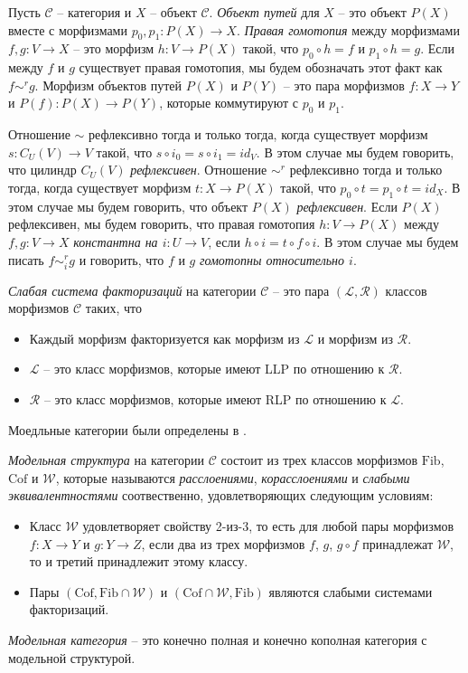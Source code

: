 \documentclass[reqno]{amsart}
\theoremstyle{definition}
\theoremstyle{remark}
\newcommand{\cat}[1]{\mathcal{#1}}
\renewcommand{\C}{\cat{C}}
\newcommand{\we}{\mathcal{W}}
\newcommand{\fib}{\mathrm{Fib}}
\newcommand{\cof}{\mathrm{Cof}}
\newcommand{\cyli}{i}
\begin{document}
Пусть $\C$ -- категория и $X$ -- объект $\C$.
\emph{Объект путей} для $X$ -- это объект $P(X)$ вместе с морфизмами $p_0,p_1 : P(X) \to X$.
\emph{Правая гомотопия} между морфизмами $f,g : V \to X$ -- это морфизм $h : V \to P(X)$ такой, что $p_0 \circ h = f$ и $p_1 \circ h = g$.
Если между $f$ и $g$ существует правая гомотопия, мы будем обозначать этот факт как $f \sim^r g$.
Морфизм объектов путей $P(X)$ и $P(Y)$ -- это пара морфизмов $f : X \to Y$ и $P(f) : P(X) \to P(Y)$, которые коммутируют с $p_0$ и $p_1$.

Отношение $\sim$ рефлексивно тогда и только тогда, когда существует морфизм $s : C_U(V) \to V$ такой, что $s \circ \cyli_0 = s \circ \cyli_1 = id_V$.
В этом случае мы будем говорить, что цилиндр $C_U(V)$ \emph{рефлексивен}.
Отношение $\sim^r$ рефлексивно тогда и только тогда, когда существует морфизм $t : X \to P(X)$ такой, что $p_0 \circ t = p_1 \circ t = id_X$.
В этом случае мы будем говорить, что объект $P(X)$ \emph{рефлексивен}.
Если $P(X)$ рефлексивен, мы будем говорить, что правая гомотопия $h : V \to P(X)$ между $f,g : V \to X$ \emph{константна на $i : U \to V$}, если $h \circ i = t \circ f \circ i$.
В этом случае мы будем писать $f \sim^r_i g$ и говорить, что $f$ и $g$ \emph{гомотопны относительно $i$}.

\begin{defn}
\emph{Слабая система факторизаций} на категории $\C$ -- это пара $(\mathcal{L},\mathcal{R})$ классов морфизмов $\C$ таких, что
\begin{itemize}
\item Каждый морфизм факторизуется как морфизм из $\mathcal{L}$ и морфизм из $\mathcal{R}$.
\item $\mathcal{L}$ -- это класс морфизмов, которые имеют LLP по отношению к $\mathcal{R}$.
\item $\mathcal{R}$ -- это класс морфизмов, которые имеют RLP по отношению к $\mathcal{L}$.
\end{itemize}
\end{defn}

Моедльные категории были определены в \cite{quillen}.

\begin{defn}
\emph{Модельная структура} на категории $\C$ состоит из трех классов морфизмов $\fib$, $\cof$ и $\we$,
которые называются \emph{расслоениями}, \emph{корасслоениями} и \emph{слабыми эквивалентностями} соотвественно, удовлетворяющих следующим условиям:
\begin{itemize}
\item Класс $\we$ удовлетворяет свойству 2-из-3, то есть для любой пары морфизмов $f : X \to Y$ и $g : Y \to Z$, если два из трех морфизмов $f$, $g$, $g \circ f$ принадлежат $\we$, то и третий принадлежит этому классу.
\item Пары $(\cof, \fib \cap \we)$ и $(\cof \cap \we, \fib)$ являются слабыми системами факторизаций.
\end{itemize}
\emph{Модельная категория} -- это конечно полная и конечно кополная категория с модельной структурой.
\end{defn}
\end{document}
